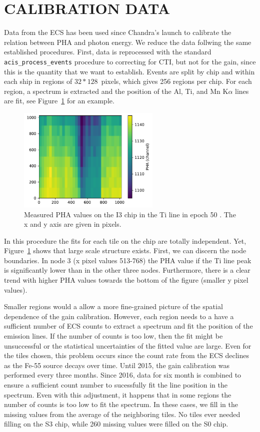 \documentclass[]{spie}  %
\begin{document}
\section{CALIBRATION DATA}
Data from the ECS has been used since Chandra's launch to calibrate the relation between PHA and photon energy. We reduce the data follwing the same established procedures. First, data is reprocessed with the standard \texttt{acis\_process\_events} procedure to correcting for CTI, but not for the gain, since this is the quantity that we want to establish. Events are split by chip and within each ship in regions of $32*128$~pixels, which gives 256 regions per chip. For each region, a spectrum is extracted and the position of the Al, Ti, and Mn K$\alpha$ lines are fit, see Figure~\ref{fig:example} for an example.
\begin{figure} [ht]
  \begin{center}
    \includegraphics[height=5cm]{figures/i1e50Ti.pdf}
  \end{center}
  \caption
      {Measured PHA values on the I3 chip in the Ti line in epoch 50 \label{fig:example}. The x and y axis are given in pixels.
}
\end{figure}
In this procedure the fits for each tile on the chip are totally independent. Yet, Figure~\ref{fig:example} shows that large scale structure exists. First, we can discern the node boundaries. In node 3 (x pixel values 513-768) the PHA value if the Ti line peak is significantly lower than in the other three nodes. Furthermore, there is a clear trend with higher PHA values towards the bottom of the figure (smaller y pixel values).

Smaller regions would a allow a more fine-grained picture of the spatial dependence of the gain calibration. However, each region needs to a have a sufficient number of ECS counts to extract a spectrum and fit the position of the emission lines. If the number of counts is too low, then the fit might be unsuccessful or the statistical uncertainties of the fitted value are large. Even for the tiles chosen, this problem occurs since the count rate from the ECS declines as the Fe-55 source decays over time. Until 2015, the gain calibration was performed every three months. Since 2016, data for six month is combined to ensure a sufficient count number to sucessfully fit the line position in the spectrum. Even with this adjustment, it happens that in some regions the number of counts is too low to fit the spectrum. In these cases, we fill in the missing values from the average of the neighboring tiles. No tiles ever needed filling on the S3 chip, while 260 missing values were filled on the S0 chip.
\end{document}
